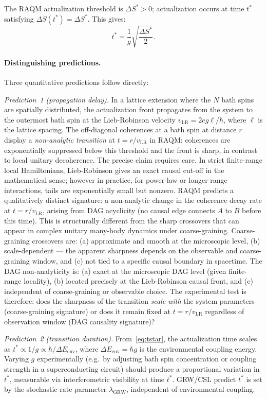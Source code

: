 \documentclass[11pt,a4paper]{article}
\theoremstyle{plain}
\theoremstyle{definition}
\theoremstyle{remark}
\begin{document}
The RAQM actualization threshold is $\Delta S^* > 0$; actualization
occurs at time $t^*$ satisfying $\Delta S(t^*) = \Delta S^*$.
This gives:
\begin{equation}
  t^* = \frac{1}{g}\sqrt{\frac{\Delta S^*}{2}}.
  \label{eq:tstar}
\end{equation}

\paragraph{Distinguishing predictions.}
Three quantitative predictions follow directly:

\emph{Prediction~1 (propagation delay).} In a lattice extension where
the $N$ bath spins are spatially distributed, the actualization front
propagates from the system to the outermost bath spin at the Lieb-Robinson
velocity $v_{\mathrm{LR}} = 2eg\ell/\hbar$, where $\ell$ is the lattice
spacing. The off-diagonal coherences at a bath spin at distance $r$ display a
\emph{non-analytic transition} at $t = r/v_{\mathrm{LR}}$ in RAQM:
coherences are exponentially suppressed below this threshold and the
front is sharp, in contrast to local unitary decoherence.
The precise claim requires care. In strict finite-range local Hamiltonians,
Lieb-Robinson gives an exact causal cut-off in the mathematical sense;
however in practice, for power-law or longer-range interactions, tails
are exponentially small but nonzero. RAQM predicts a qualitatively distinct signature: a non-analytic change in
the coherence decay rate at $t = r/v_{\mathrm{LR}}$, arising from DAG
acyclicity (no causal edge connects $A$ to $B$ before this time).
This is structurally different from the sharp crossovers that can appear
in complex unitary many-body dynamics under coarse-graining.
Coarse-graining crossovers are: (a) approximate and smooth at the
microscopic level, (b) scale-dependent --- the apparent sharpness depends
on the observable and coarse-graining window, and (c) not tied to a
specific causal boundary in spacetime. The DAG non-analyticity is:
(a) exact at the microscopic DAG level (given finite-range locality),
(b) located precisely at the Lieb-Robinson causal front, and
(c) independent of coarse-graining or observable choice.
The experimental test is therefore: does the sharpness of the transition
\emph{scale with} the system parameters (coarse-graining signature) or
does it remain fixed at $t = r/v_{\mathrm{LR}}$ regardless of observation
window (DAG causality signature)?

\emph{Prediction~2 (transition duration).} From~\eqref{eq:tstar}, the
actualization time scales as $t^* \propto 1/g \propto \hbar/\Delta E_{\mathrm{env}}$,
where $\Delta E_{\mathrm{env}} = \hbar g$ is the environmental coupling energy.
Varying $g$ experimentally (e.g.\ by adjusting bath spin concentration or
coupling strength in a superconducting circuit) should produce a proportional
variation in $t^*$, measurable via interferometric visibility at time $t^*$.
GRW/CSL predict $t^*$ is set by the stochastic rate parameter $\lambda_{\mathrm{GRW}}$,
independent of environmental coupling.
\end{document}
